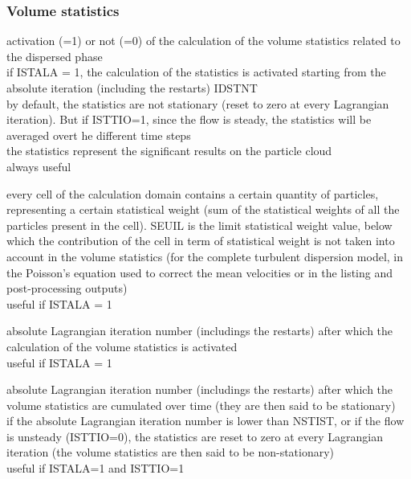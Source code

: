 \subsubsection{Volume statistics}

{activation (=1) or not (=0) of the calculation of the volume
statistics related to the dispersed phase\\
if ISTALA = 1, the calculation of the statistics is activated starting from the
absolute iteration (including the restarts) IDSTNT\\
by default, the statistics are not stationary (reset to zero at every
Lagrangian iteration). But if ISTTIO=1, since the flow is steady, the statistics
will be averaged overt he different time steps\\
the statistics represent the significant results on the particle cloud\\
always useful}

{every cell of the calculation domain contains a certain quantity of
particles, representing a certain statistical weight (sum of the
statistical weights of all the particles present in the cell). SEUIL is
the limit statistical weight value, below which the contribution of the
cell in term of statistical weight is not taken into account in the volume
statistics (for the complete turbulent dispersion model, in the
Poisson's equation used to correct the mean velocities or in the listing and
post-processing outputs)\\ 
useful if ISTALA = 1}

{absolute Lagrangian iteration number (includings the restarts) after
which the calculation of the volume statistics is activated\\
useful if ISTALA = 1}

{absolute Lagrangian iteration number (includings the restarts) after
which the volume statistics are cumulated over time (they are then said to be
stationary)\\ 
if the absolute Lagrangian iteration number is lower than NSTIST, or if the flow
is unsteady (ISTTIO=0), the statistics are reset to zero at every Lagrangian
iteration (the volume statistics are then said to be non-stationary)\\
useful if ISTALA=1 and ISTTIO=1}


